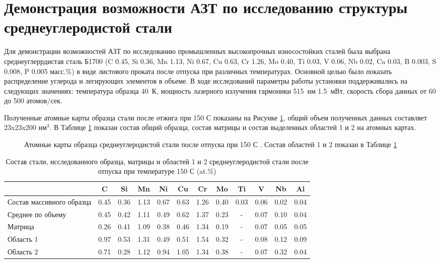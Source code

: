 \FloatBarrier

\section{Демонстрация возможности АЗТ по исследованию структуры среднеуглеродистой стали}\label{sec:ch4/sect2}

Для демонстрации возможностей АЗТ по исследованию промышленных высокопрочных износостойких сталей была выбрана среднеуглеррдистая сталь Б1700 (C 0.45, Si 0.36, Mn 1.13, Ni 0.67, Cu 0.63, Cr 1.26, Mo 0.40, Ti 0.03, V 0.06, Nb 0.02, Ca 0.03, B 0.003, S 0.008, P 0.005 масс.\%) в виде листового проката после отпуска при различных температурах. Основной целью было показать распределение углерода и легирующих элементов в объеме. В ходе исследований параметры работы установки поддерживались на следующих значениях: температура образца 40~К, мощность лазерного излучения гармоники 515~нм 1.5~мВт, скорость сбора данных от 60 до 500 атомов/сек.

Полученные атомные карты образца стали после отжига при 150 \textdegree С показаны на Рисунке \cref{fig:SteelAtomMaps1}, общий объем полученных данных составляет 23x23x200 нм$^{3}$. В Таблице \cref{tab:SteelComposition150} показан состав общий образца, состав матрицы и состав выделенных областей 1 и 2 на атомных картах.

\begin{figure}[ht]
	\caption{Атомные карты образца среднеуглеродистой стали после отпуска при 150 \textdegree С \cite{scbibRyabov}. Состав областей 1 и 2 показан в Таблице \cref{tab:SteelComposition150} }
	\label{fig:SteelAtomMaps1}
\end{figure} 

\begin{table} [htbp]
	\centering
	\caption{Состав стали, исследованного образца, матрицы и областей 1 и 2 среднеуглеродистой стали после отпуска при температуре 150 \textdegree С (at.\%)}%
	\label{tab:SteelComposition150}%
	\begin{SingleSpace}
		\begin{tabular}{|p{3cm}| c | c | c | c | c | c | c | c | c | c | c |}
			\hline
			& C & Si & Mn & Ni & Cu & Cr & Mo & Ti & V & Nb & Al     \\ \hline
			Состав массивного образца     & 0.45 & 0.36 & 1.13 & 0.67 & 0.63 & 1.26 & 0.40 & 0.03 & 0.06 & 0.02 & 0.04   \\ \hline
			Среднее по объему   & 0.45 & 0.42 & 1.11 & 0.49 & 0.62 & 1.37 & 0.23 & - & 0.07 & 0.10 & 0.04   \\  \hline		
			Матрица   & 0.26 & 0.41 & 1.09 & 0.38 & 0.46 & 1.34 & 0.19 & - & 0.07 & 0.05 & 0.05   \\  \hline	
			Область 1   & 0.97 & 0.53 & 1.31 & 0.49 & 0.51 & 1.54 & 0.32 & - & 0.08 & 0.12 & 0.09   \\  \hline
			Область 2   & 0.71 & 0.28 & 1.12 & 0.94 & 1.05 & 1.34 & 0.38 & - & 0.07 & 0.32 & 0.04   \\  \hline	
		\end{tabular}%
	\end{SingleSpace}
\end{table}

